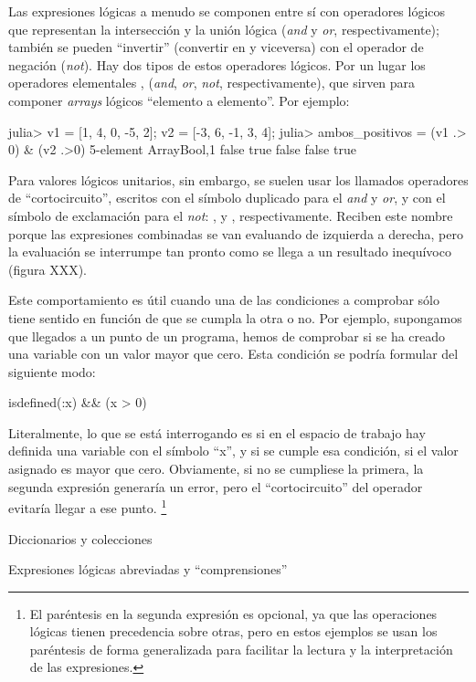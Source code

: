 ﻿\documentclass[spanish]{article}
\begin{document}
Las expresiones lógicas a menudo se componen entre sí con operadores lógicos
que representan la intersección y la unión lógica (\emph{and} y \emph{or},
respectivamente); también se pueden ``invertir'' (convertir  en 
y viceversa) con el operador de negación (\emph{not}).
Hay dos tipos de estos operadores lógicos. Por un lugar los 
operadores elementales \code{&} \code{|}, \code{~} (\emph{and}, \emph{or},
\emph{not}, respectivamente), que sirven para componer
\emph{arrays} lógicos ``elemento a elemento''. Por ejemplo:

julia> v1 = [1, 4, 0, -5, 2]; v2 = [-3, 6, -1, 3, 4];
julia> ambos_positivos = (v1 .> 0) & (v2 .>0)
5-element Array{Bool,1}
 false
  true
 false
 false
  true

Para valores lógicos unitarios, sin embargo, se suelen usar los llamados
operadores de ``cortocircuito'', escritos con el símbolo duplicado para el
\emph{and} y \emph{or}, y con el símbolo de exclamación para el \emph{not}:
\code{&&}, \code{||} y \code{!}, respectivamente.
Reciben este nombre porque las expresiones combinadas se van evaluando de
izquierda a derecha, pero la evaluación se interrumpe tan pronto como se llega
a un resultado inequívoco (figura XXX).

Este comportamiento es útil cuando una de las condiciones a comprobar sólo
tiene sentido en función de que se cumpla la otra o no.
Por ejemplo, supongamos que llegados a un punto de un programa, hemos de
comprobar si se ha creado una variable  con un valor mayor que cero.
Esta condición se podría formular del siguiente modo:

isdefined(:x) && (x > 0)

Literalmente, lo que se está interrogando es si en el espacio de trabajo
hay definida una variable con el símbolo ``x'', y si se cumple esa condición,
si el valor asignado es mayor que cero. Obviamente, si no se cumpliese la
primera, la segunda expresión generaría un error, pero el ``cortocircuito''
del operador \code{&&} evitaría llegar a ese punto.%
\footnote{El paréntesis en la segunda expresión es opcional, ya que las
operaciones lógicas tienen precedencia sobre otras, pero en estos ejemplos
se usan los paréntesis de forma generalizada para facilitar la lectura y
la interpretación de las expresiones.}


Diccionarios y colecciones

Expresiones lógicas abreviadas y ``comprensiones''
\end{document}
